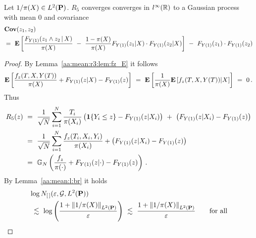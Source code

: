\begin{lemma}
  \label{aa:mean:l:r4}
  Let
  $1/\pi(X)\in L^2(\P)$.
  $R_5$ converges
  converges in
  $l^\infty(\R)$
  to a Gaussian process with mean 0 and covariance
\begin{align*}
  &
  \mathbf{Cov}
  (z_1,z_2)
  \\
  &
  =\ 
  \E
  \left[ 
 \frac{
 F_{Y(1)}(z_1 \land z_2\,|\,X)
}{\pi(X)}
\ 
-
\ 
 \frac{1-\pi(X)}{\pi(X)}
 F_{Y(1)}(z_1|X)
 \cdot
 F_{Y(1)}(z_2|X)
  \right]
  \ 
 -
 \ 
 F_{Y(1)}(z_1)
 \cdot
 F_{Y(1)}(z_2)
\end{align*}

\end{lemma}
\begin{proof}
  By Lemma~\ref{aa:mean:r3:lem:fz_E} it follows
  \begin{align*}
    \E
    \left[
      \frac{f_z(T,X,Y(T))}{\pi(X)}
      +
      F_{Y(1)}(z|X)
      -
      F_{Y(1)}(z)
      \right]
      \ 
      =
      \ 
      \E
      \left[
      \frac{1}{\pi(X)}
      \E
      \left[
        f_z(T,X,Y(T))
        |X
      \right]
      \right]
      \ 
      =
      \ 
      0
      \,.
  \end{align*}
  Thus
  \begin{align*}
    R_5(z)
    &
  \
  =
  \ 
  \frac{1}{
  \sqrt{N}
  }
    \sum_{i=1}^{N} 
    \frac{T_i}{\pi(X_i)}
    \left( 
    \mathbf{1}{\left\{ Y_i \le z \right\}}
    -
  F_{Y(1)}(z|X_i)
    \right)
    \ 
    +
    \ 
    \left( 
  F_{Y(1)}(z|X_i)
    -
  F_{Y(1)}(z)
    \right)
    \\
    &
    \ 
  =
    \ 
  \frac{1}{
  \sqrt{N}
  }
    \sum_{i=1}^{N} 
      \frac{f_z(T_i,X_i,Y_i)}{\pi(X_i)}
      +
      \left( 
      F_{Y(1)}(z|X_i)
      -
      F_{Y(1)}(z)
      \right)
      \\
      &
      \ 
      =
      \ 
      \G_N 
      \left(
       \frac{f_z}{\pi(\cdot)}
      +
      F_{Y(1)}(z|\cdot)
      -
      F_{Y(1)}(z)
      \right)
      \,.
  \end{align*}
  By Lemma~\ref{aa:mean:l:br}
  it holds
  \begin{align*}
    &
  \log
  N_{[\,]}
    (
    \varepsilon
    ,
    \mathcal{G}, L^2(\P))
    \\
    &
    \ 
    \lesssim
    \ 
    \log
    \left(
      \frac
      {
      1+
    \norm{1/\pi(X)}_{ L^2(\P)}
      }
      {\varepsilon}
    \right)
    \ 
    \lesssim
    \ 
      \frac
      {
      1+
    \norm{1/\pi(X)}_{ L^2(\P)}
      }
      {\varepsilon}
    \qquad
    \text{for all}

\end{align*}
\end{proof}
